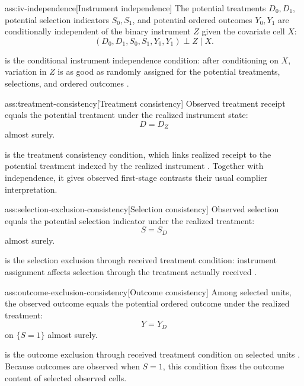 \documentclass[11pt]{article}
\begin{document}
\begin{assumptionv}{ass:iv-independence}[Instrument independence]
The potential treatments \(D_0,D_1\), potential selection indicators \(S_0,S_1\), and potential ordered outcomes \(Y_0,Y_1\) are conditionally independent of the binary instrument \(Z\) given the covariate cell \(X\):
\[
(D_0,D_1,S_0,S_1,Y_0,Y_1)\perp Z\mid X.
\]
\end{assumptionv}

 is the conditional instrument independence condition: after conditioning on \(X\), variation in \(Z\) is as good as randomly assigned for the potential treatments, selections, and ordered outcomes \citep{AngristImbensRubin1996}.

\begin{assumptionv}{ass:treatment-consistency}[Treatment consistency]
Observed treatment receipt equals the potential treatment under the realized instrument state:
\[
D=D_Z
\]
almost surely.
\end{assumptionv}

 is the treatment consistency condition, which links realized receipt to the potential treatment indexed by the realized instrument \citep{AngristImbensRubin1996}. Together with independence, it gives observed first-stage contrasts their usual complier interpretation.

\begin{assumptionv}{ass:selection-exclusion-consistency}[Selection consistency]
Observed selection equals the potential selection indicator under the realized treatment:
\[
S=S_D
\]
almost surely.
\end{assumptionv}

 is the selection exclusion through received treatment condition: instrument assignment affects selection through the treatment actually received \citep{KennedyHarrisKeele2019}.

\begin{assumptionv}{ass:outcome-exclusion-consistency}[Outcome consistency]
Among selected units, the observed outcome equals the potential ordered outcome under the realized treatment:
\[
Y=Y_D
\]
on \(\{S=1\}\) almost surely.
\end{assumptionv}

 is the outcome exclusion through received treatment condition on selected units \citep{KennedyHarrisKeele2019}. Because outcomes are observed when \(S=1\), this condition fixes the outcome content of selected observed cells.
\end{document}
